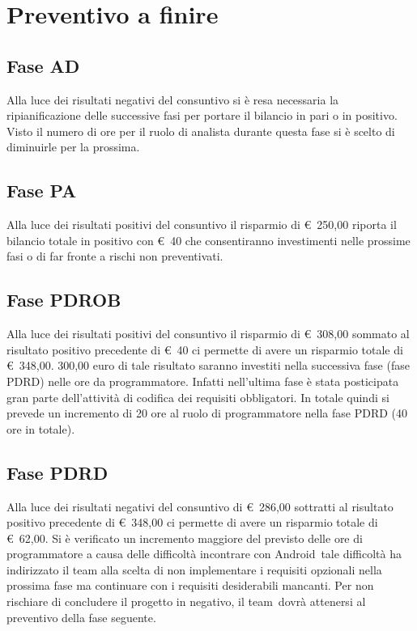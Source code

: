 \documentclass[../PianoProgetto.tex]{subfiles}
\begin{document}
\section{Preventivo a finire}

	\subsection{Fase AD}
		Alla luce dei risultati negativi del consuntivo si è resa necessaria la ripianificazione delle successive fasi per portare il bilancio in pari o in positivo. Visto il numero di ore per il ruolo di analista durante questa fase si è scelto di diminuirle per la prossima.
	
	\subsection{Fase PA}
		Alla luce dei risultati positivi del consuntivo il risparmio di \euro\ 250,00 riporta il bilancio totale in positivo con \euro\ 40 che consentiranno investimenti nelle prossime fasi o di far fronte a rischi non preventivati.
	
	\subsection{Fase PDROB}
		Alla luce dei risultati positivi del consuntivo il risparmio di \euro\ 308,00 sommato al risultato positivo precedente di \euro\ 40 ci permette di avere un risparmio totale di \euro\ 348,00. 300,00 euro di tale risultato saranno investiti nella successiva fase (fase PDRD) nelle ore da programmatore. Infatti nell'ultima fase è stata posticipata gran parte dell'attività di codifica dei requisiti obbligatori. In totale quindi si prevede un incremento di 20 ore al ruolo di programmatore nella fase PDRD (40 ore in totale).
	
	\subsection{Fase PDRD}
		Alla luce dei risultati negativi del consuntivo di \euro\ 286,00 sottratti al risultato positivo precedente di \euro\ 348,00 ci permette di avere un risparmio totale di \euro\ 62,00. Si è verificato un incremento maggiore del previsto delle ore di programmatore a causa delle difficoltà incontrare con Android\g\ tale difficoltà ha indirizzato il team alla scelta di non implementare i requisiti opzionali nella prossima fase ma continuare con i requisiti desiderabili mancanti. Per non rischiare di concludere il progetto in negativo, il team\g\ dovrà attenersi al preventivo della fase seguente.
	
\end{document}
